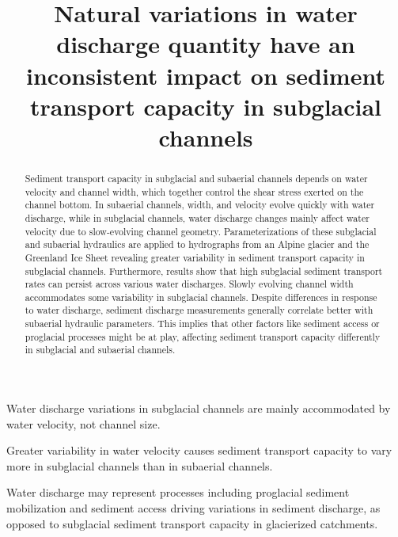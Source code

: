 \documentclass[draft]{agujournal2019}
\begin{document}
\title{Natural variations in water discharge quantity have an inconsistent impact on sediment transport capacity in subglacial channels}






\begin{keypoints}
\item Water discharge variations in subglacial channels are mainly accommodated by water velocity, not channel size.
\item Greater variability in water velocity causes sediment transport capacity to vary more in subglacial channels than in subaerial channels.
\item Water discharge may represent processes including proglacial sediment mobilization and sediment access driving variations in sediment discharge, as opposed to subglacial sediment transport capacity in glacierized catchments.
\end{keypoints}

\begin{abstract}  Sediment transport capacity in subglacial and subaerial channels depends on  water velocity and channel width, which together control the shear stress exerted on the channel bottom.
  In subaerial channels, width, and velocity evolve quickly with water discharge, while in subglacial channels, water discharge changes mainly affect water velocity due to slow-evolving channel geometry.
  Parameterizations of these subglacial and subaerial hydraulics are applied to hydrographs from an Alpine glacier and the Greenland Ice Sheet revealing greater variability in sediment transport capacity in subglacial channels.
  Furthermore, results show that high subglacial sediment transport rates can persist across various water discharges.
  Slowly evolving channel width accommodates some variability in subglacial channels.
  Despite differences in response to water discharge, sediment discharge measurements generally correlate better with subaerial hydraulic parameters.
  This implies that other factors like sediment access or proglacial processes might be at play, affecting sediment transport capacity differently in subglacial and subaerial channels.
\end{abstract}
\end{document}
